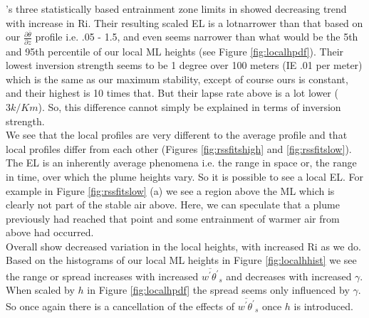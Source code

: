 \citeauthor{BrooksFowler2}'s three statistically based entrainment zone limits in 
\cite{BrooksFowler2} showed decreasing trend with increase in \acs{Ri}. Their resulting
scaled \acs{EL} is a lotnarrower than that based on our $\frac{\partial \overline{\theta}}{\partial z}$ profile i.e. .05 - 1.5, and even seems narrower than
what would be the 5th and 95th percentile of our local \acs{ML} heights (see Figure \ref{fig:localhpdf}).  Their lowest
inversion strength seems to be 1 degree over 100 meters (IE .01 per meter) which is
the same as our maximum stability, except of course ours is constant, and their highest is
10 times that. But their lapse rate above is a lot lower ($3k/Km$).  So, this difference cannot simply be explained in terms of inversion strength.\\  %

We see that the local profiles are very different to the average profile and that local
profiles differ from each other (Figures \ref{fig:rssfitshigh} and \ref{fig:rssfitslow}).  The \acs{EL} is an inherently average phenomena i.e.
the range in space or, the range in time, over which the plume heights vary.  So
it is possible to see a local \acs{EL}.  For example in Figure \ref{fig:rssfitslow} (a)
we see a region above the \acs{ML} which is clearly not part of the stable
air above.  Here, we can speculate that a plume previously had reached that point
and some entrainment of warmer air from above had occurred.\\
 
Overall \citeauthor{SullMoengStev} 
\cite{SullMoengStev} show decreased variation in the local heights, with increased \acs{Ri} as we do.  Based on the histograms of our local \acs{ML} heights in Figure \ref{fig:localhhist} we see the range or spread
increases with increased $\overline{w^{'}\theta^{'}}_{s}$ and decreases with increased
$\gamma$.  When scaled by $h$ in Figure \ref{fig:localhpdf} the spread seems only influenced by $\gamma$.  So once
again there is a cancellation of the effects of $\overline{w^{'}\theta^{'}}_{s}$ once
$h$ is introduced.

